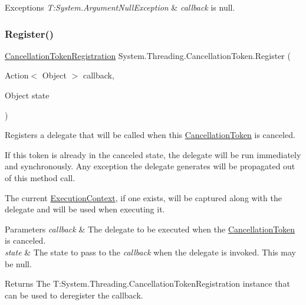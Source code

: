 \begin{DoxyExceptions}{Exceptions}
{\em T\+:\+System.\+Argument\+Null\+Exception} & {\itshape callback}  is null.\\
\hline
\end{DoxyExceptions}
\mbox{\label{struct_system_1_1_threading_1_1_cancellation_token_a85a6199ca14938b28a3fd418c145ff85}} 
\subsubsection{\texorpdfstring{Register()}{Register()}\hspace{0.1cm}{\footnotesize\ttfamily [2/2]}}
{\footnotesize\ttfamily \hyperlink{struct_system_1_1_threading_1_1_cancellation_token_registration}{Cancellation\+Token\+Registration} System.\+Threading.\+Cancellation\+Token.\+Register (\begin{DoxyParamCaption}\item[{Action$<$ Object $>$}]{callback,  }\item[{Object}]{state }\end{DoxyParamCaption})\hspace{0.3cm}{\ttfamily [inline]}}



Registers a delegate that will be called when this \hyperlink{}{Cancellation\+Token} is canceled. 

If this token is already in the canceled state, the delegate will be run immediately and synchronously. Any exception the delegate generates will be propagated out of this method call. 

The current \hyperlink{}{Execution\+Context}, if one exists, will be captured along with the delegate and will be used when executing it. 


\begin{DoxyParams}{Parameters}
{\em callback} & The delegate to be executed when the \hyperlink{}{Cancellation\+Token} is canceled.\\
\hline
{\em state} & The state to pass to the {\itshape callback}  when the delegate is invoked. This may be null.\\
\hline
\end{DoxyParams}
\begin{DoxyReturn}{Returns}
The T\+:\+System.\+Threading.\+Cancellation\+Token\+Registration instance that can be used to deregister the callback.
\end{DoxyReturn}

